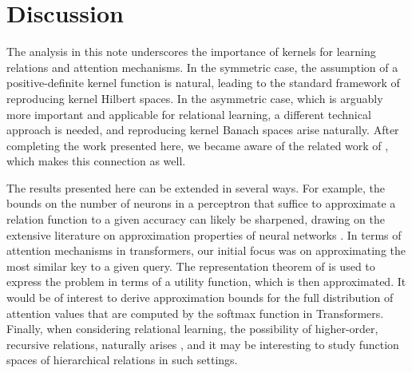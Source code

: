 \section{Discussion}

The analysis in this note underscores the importance of kernels for learning relations and attention mechanisms. 
In the symmetric case, the assumption of a positive-definite kernel function is natural, leading to the standard framework of reproducing kernel Hilbert spaces. In the asymmetric case, which is arguably more important and applicable for relational learning, a different technical approach is needed, and reproducing kernel Banach spaces arise naturally. After completing the work presented here, we became aware of the related work 
of \citet{wright2021transformers}, which makes this connection as well. 

The results presented here can be extended in several ways. For example, the bounds on the 
number of neurons in a perceptron that suffice to approximate a relation function to a given accuracy can likely be sharpened, drawing on the extensive literature on approximation properties of neural networks 
\citep[e.g.,][]{petrushev1998approximation,pinkus1999approximation,makovoz1998uniform,burger2001error,maiorov2006approximation,bachBreakingCurseDimensionality2016}. In terms of attention mechanisms in transformers, our initial focus was on approximating the most similar key to a given query. The representation theorem of \citet{debreuRepresentationPreferenceOrdering1954} is used to express the problem in terms of a utility function, which is then approximated. It would be of interest to derive approximation bounds for the full distribution 
of attention values that are computed by the softmax function in Transformers. Finally, when considering 
relational learning, the possibility of higher-order, recursive relations, naturally arises \citep[e.g.,][]{altabaaRelationalConvolutionalNetworks2023}, and it may be interesting to study function spaces of hierarchical relations in such settings.

%

